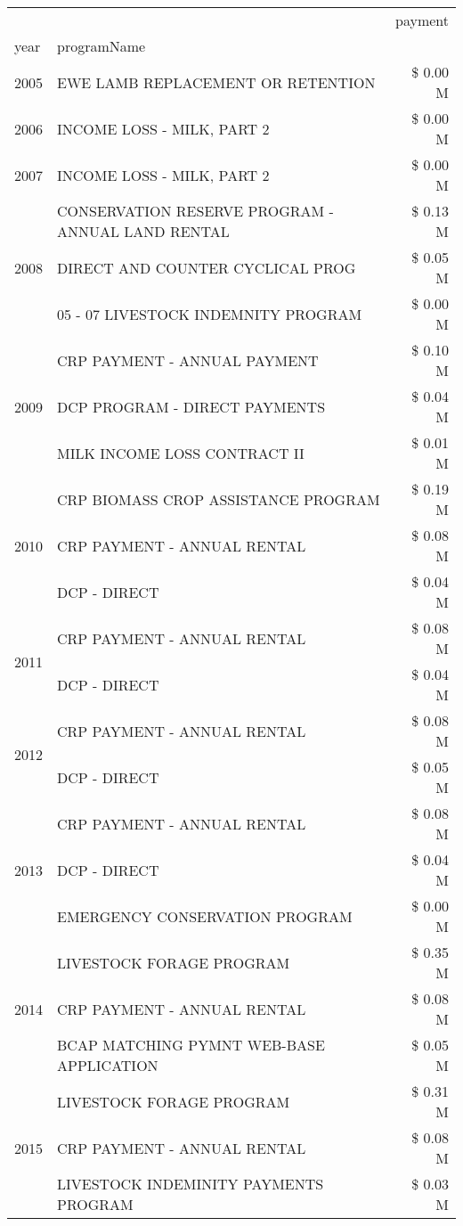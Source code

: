 \begin{tabular}{llr}
\toprule
 &  & payment \\
year & programName &  \\
\midrule
2005 & EWE LAMB REPLACEMENT OR RETENTION & \$ 0.00 M \\
\cline{1-3}
2006 & INCOME LOSS - MILK, PART 2 & \$ 0.00 M \\
\cline{1-3}
2007 & INCOME LOSS - MILK, PART 2 & \$ 0.00 M \\
\cline{1-3}
\multirow[t]{3}{*}{2008} & CONSERVATION RESERVE PROGRAM - ANNUAL LAND RENTAL & \$ 0.13 M \\
 & DIRECT AND COUNTER CYCLICAL PROG & \$ 0.05 M \\
 & 05 - 07 LIVESTOCK INDEMNITY PROGRAM & \$ 0.00 M \\
\cline{1-3}
\multirow[t]{3}{*}{2009} & CRP PAYMENT - ANNUAL PAYMENT & \$ 0.10 M \\
 & DCP PROGRAM - DIRECT PAYMENTS & \$ 0.04 M \\
 & MILK INCOME LOSS CONTRACT II & \$ 0.01 M \\
\cline{1-3}
\multirow[t]{3}{*}{2010} & CRP BIOMASS CROP ASSISTANCE PROGRAM & \$ 0.19 M \\
 & CRP PAYMENT - ANNUAL RENTAL & \$ 0.08 M \\
 & DCP - DIRECT & \$ 0.04 M \\
\cline{1-3}
\multirow[t]{2}{*}{2011} & CRP PAYMENT - ANNUAL RENTAL & \$ 0.08 M \\
 & DCP - DIRECT & \$ 0.04 M \\
\cline{1-3}
\multirow[t]{2}{*}{2012} & CRP PAYMENT - ANNUAL RENTAL & \$ 0.08 M \\
 & DCP - DIRECT & \$ 0.05 M \\
\cline{1-3}
\multirow[t]{3}{*}{2013} & CRP PAYMENT - ANNUAL RENTAL & \$ 0.08 M \\
 & DCP - DIRECT & \$ 0.04 M \\
 & EMERGENCY CONSERVATION PROGRAM & \$ 0.00 M \\
\cline{1-3}
\multirow[t]{3}{*}{2014} & LIVESTOCK FORAGE PROGRAM & \$ 0.35 M \\
 & CRP PAYMENT - ANNUAL RENTAL & \$ 0.08 M \\
 & BCAP MATCHING PYMNT WEB-BASE APPLICATION & \$ 0.05 M \\
\cline{1-3}
\multirow[t]{3}{*}{2015} & LIVESTOCK FORAGE PROGRAM & \$ 0.31 M \\
 & CRP PAYMENT - ANNUAL RENTAL & \$ 0.08 M \\
 & LIVESTOCK INDEMINITY PAYMENTS PROGRAM & \$ 0.03 M \\

\end{tabular}
